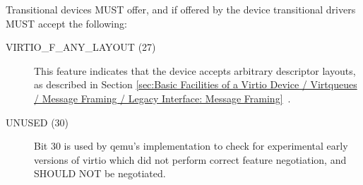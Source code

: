 Transitional devices MUST offer, and if offered by the device
transitional drivers MUST accept the following:
\begin{description}
\item[VIRTIO_F_ANY_LAYOUT (27)] This feature indicates that the device
  accepts arbitrary descriptor layouts, as described in Section
  \ref{sec:Basic Facilities of a Virtio Device / Virtqueues / Message Framing / Legacy Interface: Message Framing}~.

\item[UNUSED (30)] Bit 30 is used by qemu's implementation to check
  for experimental early versions of virtio which did not perform
  correct feature negotiation, and SHOULD NOT be negotiated.
\end{description}
